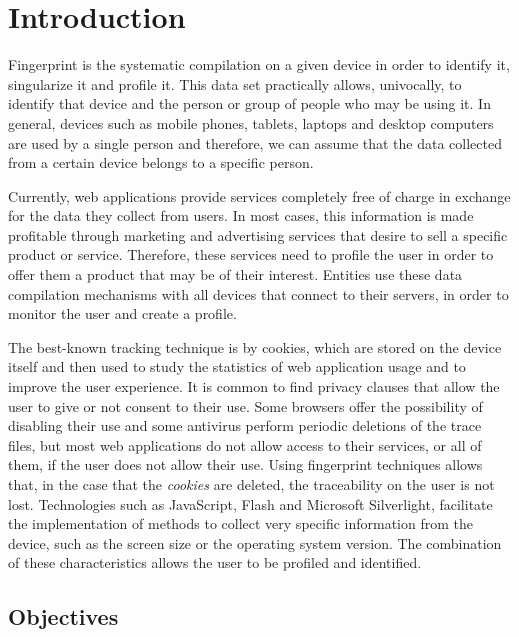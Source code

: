 \chapter{Introduction}

Fingerprint is the systematic compilation on a given device in order to identify it, singularize it and profile it. This data set practically allows, univocally, to identify that device and the person or group of people who may be using it. In general, devices such as mobile phones, tablets, laptops and desktop computers are used by a single person and therefore, we can assume that the data collected from a certain device belongs to a specific person\cite{Huella}. \par

Currently, web applications provide services completely free of charge in exchange for the data they collect from users. In most cases, this information is made profitable through marketing and advertising services that desire to sell a specific product or service. Therefore, these services need to profile the user in order to offer them a product that may be of their interest. Entities use these data compilation mechanisms with all devices that connect to their servers, in order to monitor the user and create a profile. \par

The best-known tracking technique is by cookies, which are stored on the device itself and then used to study the statistics of web application usage and to improve the user experience. It is common to find privacy clauses that allow the user to give or not consent to their use. Some browsers offer the possibility of disabling their use and some antivirus perform periodic deletions of the trace files, but most web applications do not allow access to their services, or all of them, if the user does not allow their use. Using fingerprint techniques allows that, in the case that the \textit{cookies} are deleted, the traceability on the user is not lost. Technologies such as JavaScript, Flash and Microsoft Silverlight, facilitate the implementation of methods to collect very specific information from the device, such as the screen size or the operating system version. The combination of these characteristics allows the user to be profiled and identified. \par

\section{Objectives}
 

